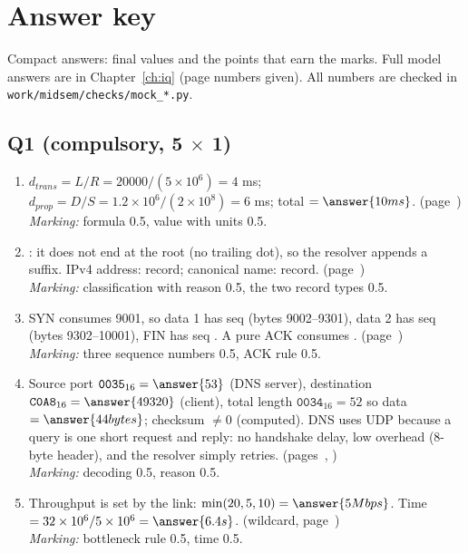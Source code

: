 \clearpage
\section*{Answer key}
Compact answers: final values and the points that earn the marks. Full model answers are in Chapter~\ref{ch:iq} (page numbers given). All numbers are checked in \texttt{work/midsem/checks/mock\_*.py}.

\subsection*{Q1 (compulsory, 5 $\times$ 1)}
\begin{enumerate}[label=\textbf{(\alph*)},leftmargin=8mm]
\item $d_{trans}=L/R=20000/(5\times10^{6})=4$ ms; $d_{prop}=D/S=1.2\times10^{6}/(2\times10^{8})=6$ ms; total $=\answer{10 ms}$. \hfill (page~\pageref{iq:C01})\\
\textit{Marking:} formula 0.5, value with units 0.5.
\item {}: it does not end at the root (no trailing dot), so the resolver appends a suffix. IPv4 address:  record; canonical name:  record. \hfill (page~\pageref{iq:C17})\\
\textit{Marking:} classification with reason 0.5, the two record types 0.5.
\item SYN consumes 9001, so data 1 has seq  (bytes 9002--9301), data 2 has seq  (bytes 9302--10001), FIN has seq . A pure ACK consumes . \hfill (page~\pageref{iq:C29})\\
\textit{Marking:} three sequence numbers 0.5, ACK rule 0.5.
\item Source port $\texttt{0035}_{16}=\answer{53}$ (DNS server), destination $\texttt{C0A8}_{16}=\answer{49320}$ (client), total length $\texttt{0034}_{16}=52$ so data $=\answer{44 bytes}$; checksum $\neq0$ (computed). DNS uses UDP because a query is one short request and reply: no handshake delay, low overhead (8-byte header), and the resolver simply retries. \hfill (pages~\pageref{iq:C28}, \pageref{iq:C19})\\
\textit{Marking:} decoding 0.5, reason 0.5.
\item Throughput is set by the  link: $\min(20,5,10)=\answer{5 Mbps}$. Time $=32\times10^{6}/5\times10^{6}=\answer{6.4 s}$. \hfill (wildcard, page~\pageref{iq:C03})\\
\textit{Marking:} bottleneck rule 0.5, time 0.5.
\end{enumerate}

